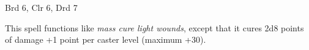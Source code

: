 
\begin{description*}
\item[Level:] Brd 6, Clr 6, Drd 7
\end{description*}

This spell functions like \textit{mass cure light wounds}, except that it cures
2d8 points of damage +1 point per caster level (maximum +30).